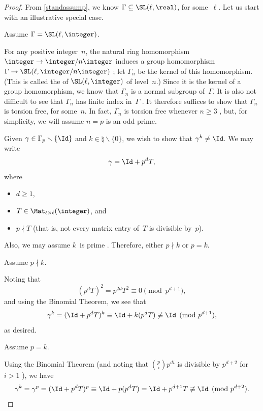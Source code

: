 \begin{proof}
 From \cref{standassump}, we know $\Gamma \subseteq \SL(\ell,\real)$, for some~$\ell$. Let us start with an illustrative special case.

\setcounter{case}{0}

\begin{case} \label{torsionfree-SLnZ}
 Assume $\Gamma = \SL(\ell,\integer)$.
 \end{case}
 For any positive integer~$n$, the natural ring
homomorphism $\integer \to \integer/n\integer$ induces a
group homomorphism
 $\Gamma \to \SL(\ell,\integer/n\integer)$ ;
 let $\Gamma_n$ be the kernel of this homomorphism. (This
is called the \label{PrincCongSubgrp} of
$\SL(\ell,\integer)$ of level~$n$.) Since it is the kernel of a 
group homomorphism, we know that $\Gamma_n$ is a normal 
subgroup of~$\Gamma$. It is also not difficult to see that
$\Gamma_n$ has finite index in~$\Gamma$ . It therefore
suffices to show that $\Gamma_n$ is torsion free, for
some~$n$.
In fact, $\Gamma_n$ is torsion free whenever $n \ge
3$ , but, for simplicity, we will 
assume $n = p$ is an odd prime.

Given $\gamma \in \Gamma_p \smallsetminus \{\Id\}$ and $k
\in \natural \smallsetminus \{0\}$, we wish to show that
$\gamma^k \neq \Id$. We may write
 $$\gamma = \Id + p^d T ,$$
 where
 \begin{itemize}
 \item $d \ge 1$,
 \item $T \in
\Mat_{\ell \times \ell}(\integer)$, and
 \item $p \nmid T$ (that is, not every matrix entry of~$T$ is divisible by~$p$).
 \end{itemize}
 Also, we may assume $k$~is prime .
Therefore, either $p \nmid k$ or $p = k$.

\begin{subcase}
 Assume $p \nmid k$.
 \end{subcase}
 Noting that
 $$ (p^d T)^2 = p^{2d} T^2 \equiv 0 \pmod{p^{d+1}} ,$$
 and using the Binomial Theorem, we see that
 $$ \gamma^k = (\Id + p^d T)^k
 \equiv \Id + k(p^d T) 
 \not\equiv \Id
 \pmod{p^{d+1}} ,$$
 as desired.

\begin{subcase}
 Assume $p = k$.
 \end{subcase}
 Using the Binomial Theorem (and noting that $\binom{p}{i} p^{di}$ is divisible by $p^{d + 2}$ for $i > 1$ ), we have
 $$ \gamma^k = \gamma^p = (\Id + p^d T)^p
 \equiv \Id + p (p^d T) 
 = \Id + p^{d+1} T
 \not\equiv \Id
 \pmod{p^{d+2}} .$$


\end{proof}
